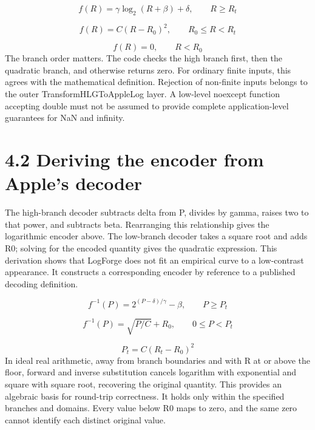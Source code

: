 \documentclass[11pt,a4paper,openany]{book}
\begin{document}
\begin{equation}
f(R)=\gamma\log_2(R+\beta)+\delta,\qquad R\geq R_t
\end{equation}

\begin{equation}
f(R)=C(R-R_0)^2,\qquad R_0\leq R<R_t
\end{equation}

\begin{equation}
f(R)=0,\qquad R<R_0
\end{equation}
The branch order matters. The code checks the high branch first, then the quadratic branch, and otherwise returns zero. For ordinary finite inputs, this agrees with the mathematical definition. Rejection of non-finite inputs belongs to the outer TransformHLGToAppleLog layer. A low-level noexcept function accepting double must not be assumed to provide complete application-level guarantees for NaN and infinity.


\section*{4.2 Deriving the encoder from Apple's decoder}
The high-branch decoder subtracts delta from P, divides by gamma, raises two to that power, and subtracts beta. Rearranging this relationship gives the logarithmic encoder above. The low-branch decoder takes a square root and adds R0; solving for the encoded quantity gives the quadratic expression. This derivation shows that LogForge does not fit an empirical curve to a low-contrast appearance. It constructs a corresponding encoder by reference to a published decoding definition.


\begin{equation}
f^{-1}(P)=2^{(P-\delta)/\gamma}-\beta,\qquad P\geq P_t
\end{equation}

\begin{equation}
f^{-1}(P)=\sqrt{P/C}+R_0,\qquad 0\leq P<P_t
\end{equation}

\begin{equation}
P_t=C(R_t-R_0)^2
\end{equation}
In ideal real arithmetic, away from branch boundaries and with R at or above the floor, forward and inverse substitution cancels logarithm with exponential and square with square root, recovering the original quantity. This provides an algebraic basis for round-trip correctness. It holds only within the specified branches and domains. Every value below R0 maps to zero, and the same zero cannot identify each distinct original value.
\end{document}
